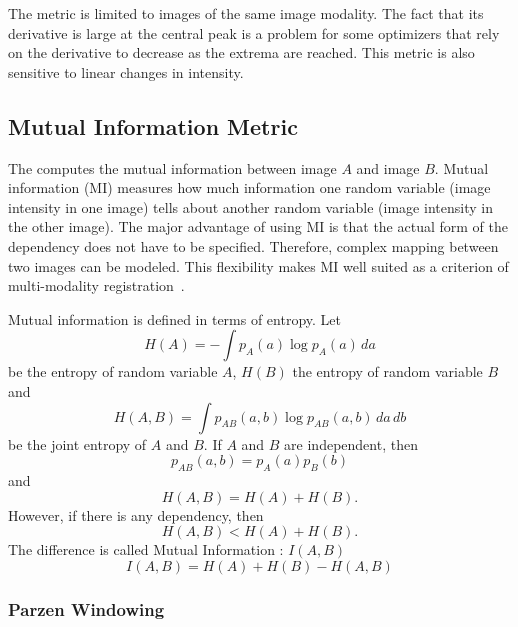 The metric is limited to images of the same image modality.  The
fact that its derivative is large at the central peak is a problem for some
optimizers that rely on the derivative to decrease as the extrema are
reached.  This metric is also sensitive to linear changes in intensity.


\subsection{Mutual Information Metric}
\label{sec:MutualInformationMetric}

The  computes the mutual
information between image $A$ and image $B$.  Mutual information (MI)
measures how much information one random variable (image intensity in one
image) tells about another random variable (image intensity in the other
image). The major advantage of using MI is that the actual form of the
dependency does not have to be specified.  Therefore, complex mapping between
two images can be modeled.  This flexibility makes MI well suited as a
criterion of multi-modality registration~\cite{Pluim2003}.

Mutual information is defined in terms of entropy. Let
\begin{equation}
H(A) = - \int p_A(a) \log p_A(a)\, da
\end{equation}
be the entropy of random variable $A$, $H(B)$ the entropy of 
random variable $B$ and 
\begin{equation}
H(A,B) = \int p_{AB}(a,b) \log p_{AB}(a,b)\,da\,db
\end{equation}
be the joint entropy of $A$ and $B$. If $A$ and $B$ are independent, then
\begin{equation}
p_{AB}(a,b) = p_A(a) p_B(b)
\end{equation}
and
\begin{equation}
H(A,B) = H(A) + H(B).
\end{equation}
However, if there is any dependency, then
\begin{equation}
H(A,B)<H(A)+H(B).
\end{equation}
The difference is called Mutual Information : \( I(A,B) \)
\begin{equation}
I(A,B)=H(A)+H(B)-H(A,B)
\end{equation}

\subsubsection{Parzen Windowing}

